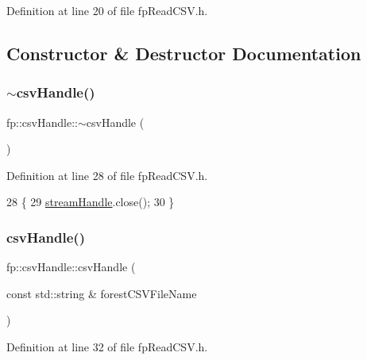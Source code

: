 Definition at line 20 of file fp\+Read\+C\+S\+V.\+h.



\subsection{Constructor \& Destructor Documentation}
\mbox{\label{classfp_1_1csvHandle_a722156950bc78ce1dbf34626d292acdb}} 
\subsubsection{\texorpdfstring{$\sim$csv\+Handle()}{~csvHandle()}}
{\footnotesize\ttfamily fp\+::csv\+Handle\+::$\sim$csv\+Handle (\begin{DoxyParamCaption}{ }\end{DoxyParamCaption})\hspace{0.3cm}{\ttfamily [inline]}}



Definition at line 28 of file fp\+Read\+C\+S\+V.\+h.


\begin{DoxyCode}
28                         \{
29                 \hyperlink{classfp_1_1csvHandle_a42c4ad8f38a95c724dfa2b173991a524}{streamHandle}.close();
30             \}
\end{DoxyCode}
\mbox{\label{classfp_1_1csvHandle_a2fa98814fc2300998a0df908e4e520d3}} 
\subsubsection{\texorpdfstring{csv\+Handle()}{csvHandle()}}
{\footnotesize\ttfamily fp\+::csv\+Handle\+::csv\+Handle (\begin{DoxyParamCaption}\item[{const std\+::string \&}]{forest\+C\+S\+V\+File\+Name }\end{DoxyParamCaption})\hspace{0.3cm}{\ttfamily [inline]}}



Definition at line 32 of file fp\+Read\+C\+S\+V.\+h.


